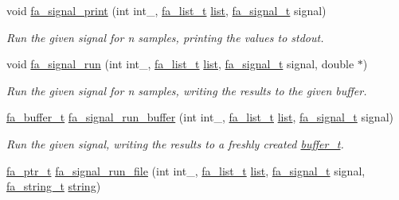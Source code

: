 \begin{DoxyCompactItemize}
void \hyperlink{group___fa_signal_gadd54d885961f13a382d1c7caa9db8eb2}{fa\-\_\-signal\-\_\-print} (int int\-\_\-, \hyperlink{group___fa_list_ga35ecb12ab934ded0cce0bcf28e3bc5d2}{fa\-\_\-list\-\_\-t} \hyperlink{literals_8h_a4ddd63dfcfec2b4d5741a56aa6003c76}{list}, \hyperlink{group___fa_signal_gac5c72f160cd6e93a6783551627b166e5}{fa\-\_\-signal\-\_\-t} signal)
\begin{DoxyCompactList}\small\item\em Run the given signal for {\itshape n} samples, printing the values to {\ttfamily stdout}. \end{DoxyCompactList}\item 
void \hyperlink{group___fa_signal_gacb3351ca95bcbe1706fc5bdad9cac276}{fa\-\_\-signal\-\_\-run} (int int\-\_\-, \hyperlink{group___fa_list_ga35ecb12ab934ded0cce0bcf28e3bc5d2}{fa\-\_\-list\-\_\-t} \hyperlink{literals_8h_a4ddd63dfcfec2b4d5741a56aa6003c76}{list}, \hyperlink{group___fa_signal_gac5c72f160cd6e93a6783551627b166e5}{fa\-\_\-signal\-\_\-t} signal, double $\ast$)
\begin{DoxyCompactList}\small\item\em Run the given signal for {\itshape n} samples, writing the results to the given buffer. \end{DoxyCompactList}\item 
\hyperlink{group___fa_buffer_ga0ed7a1d783ab322e2e8be02432d0839e}{fa\-\_\-buffer\-\_\-t} \hyperlink{group___fa_signal_ga3e95f099a5fd9d12381516d2036dd8d2}{fa\-\_\-signal\-\_\-run\-\_\-buffer} (int int\-\_\-, \hyperlink{group___fa_list_ga35ecb12ab934ded0cce0bcf28e3bc5d2}{fa\-\_\-list\-\_\-t} \hyperlink{literals_8h_a4ddd63dfcfec2b4d5741a56aa6003c76}{list}, \hyperlink{group___fa_signal_gac5c72f160cd6e93a6783551627b166e5}{fa\-\_\-signal\-\_\-t} signal)
\begin{DoxyCompactList}\small\item\em Run the given signal, writing the results to a freshly created \hyperlink{util_8h_a30fe0633adbbaa7a5b6a4fd8d479bf0c}{buffer\-\_\-t}. \end{DoxyCompactList}\item 
\hyperlink{group___fa_ga915ddeae99ad7568b273d2b876425197}{fa\-\_\-ptr\-\_\-t} \hyperlink{group___fa_signal_gacd55b93a312f68fd639784832cb04410}{fa\-\_\-signal\-\_\-run\-\_\-file} (int int\-\_\-, \hyperlink{group___fa_list_ga35ecb12ab934ded0cce0bcf28e3bc5d2}{fa\-\_\-list\-\_\-t} \hyperlink{literals_8h_a4ddd63dfcfec2b4d5741a56aa6003c76}{list}, \hyperlink{group___fa_signal_gac5c72f160cd6e93a6783551627b166e5}{fa\-\_\-signal\-\_\-t} signal, \hyperlink{group___fa_string_gacada63033b77bc6c39fa632ae199349b}{fa\-\_\-string\-\_\-t} \hyperlink{util_8h_a41106000aac73b61e4fc2ef9dd39a603}{string})

\end{DoxyCompactItemize}
